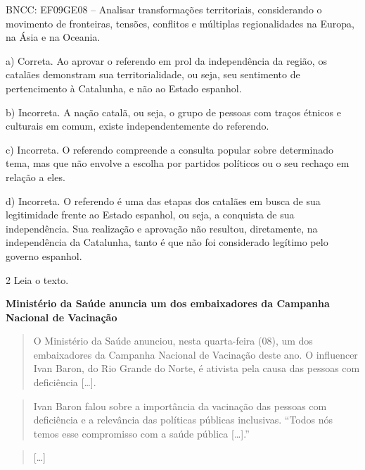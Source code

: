 BNCC: EF09GE08 -- Analisar transformações territoriais, considerando o
movimento de fronteiras, tensões, conflitos e múltiplas regionalidades
na Europa, na Ásia e na Oceania.

a) Correta. Ao aprovar o referendo em prol da independência da região,
os catalães demonstram sua territorialidade, ou seja, seu sentimento de
pertencimento à Catalunha, e não ao Estado espanhol.

b) Incorreta. A nação catalã, ou seja, o grupo de pessoas com traços
étnicos e culturais em comum, existe independentemente do referendo.

c) Incorreta. O referendo compreende a consulta popular sobre
determinado tema, mas que não envolve a escolha por partidos políticos
ou o seu rechaço em relação a eles.

d) Incorreta. O referendo é uma das etapas dos catalães em busca de sua
legitimidade frente ao Estado espanhol, ou seja, a conquista de sua
independência. Sua realização e aprovação não resultou, diretamente, na
independência da Catalunha, tanto é que não foi considerado legítimo
pelo governo espanhol.

\num{2} Leia o texto.

\textbf{Ministério da Saúde anuncia um dos embaixadores da Campanha Nacional de Vacinação}

\begin{quote}
O Ministério da Saúde anunciou, nesta quarta-feira (08), um dos
embaixadores da Campanha Nacional de Vacinação deste ano. O influencer
Ivan Baron, do Rio Grande do Norte, é ativista pela causa das pessoas
com deficiência {[}\ldots{}{]}.
\end{quote}

\begin{quote}
Ivan Baron falou sobre a importância da vacinação das pessoas com
deficiência e a relevância das políticas públicas inclusivas. ``Todos
nós temos esse compromisso com a saúde pública {[}\ldots{}{]}.''
\end{quote}

\begin{quote}
{[}\ldots{}{]}
\end{quote}


